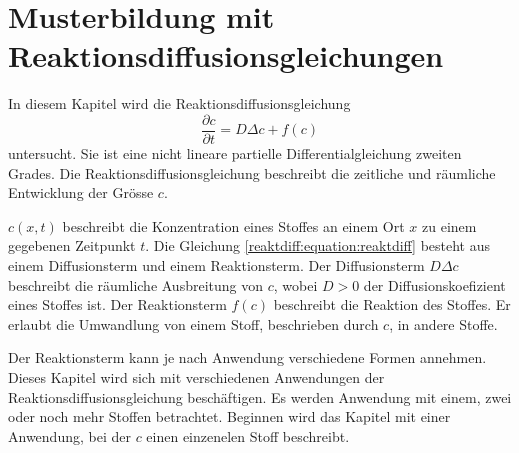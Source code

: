 %
%
%
%
\chapter{Musterbildung mit Reaktionsdiffusionsgleichungen\label{chapter:reaktdiff}}
\begin{refsection}

In diesem Kapitel wird die Reaktionsdiffusionsgleichung
\begin{equation}
\label{reaktdiff:equation:reaktdiff}
\frac{\partial c}{\partial t} = D \Delta c + f(c)
\end{equation}
untersucht.
Sie ist eine nicht lineare partielle Differentialgleichung zweiten Grades.
Die Reaktionsdiffusionsgleichung beschreibt die zeitliche und räumliche Entwicklung der Grösse \(c\).

\(c(x,t)\) beschreibt die Konzentration eines Stoffes an einem Ort \(x\) zu einem gegebenen Zeitpunkt \(t\).
Die Gleichung \eqref{reaktdiff:equation:reaktdiff} besteht aus einem Diffusionsterm und einem Reaktionsterm.
Der Diffusionsterm \(D \Delta c\) beschreibt die räumliche Ausbreitung von \(c\), wobei \(D > 0\) der Diffusionskoefizient eines Stoffes ist.
Der Reaktionsterm \(f(c)\) beschreibt die Reaktion des Stoffes.
Er erlaubt die Umwandlung von einem Stoff, beschrieben durch \(c\), in andere Stoffe.

Der Reaktionsterm kann je nach Anwendung verschiedene Formen annehmen.
Dieses Kapitel wird sich mit verschiedenen Anwendungen der Reaktionsdiffusionsgleichung beschäftigen.
Es werden Anwendung mit einem, zwei oder noch mehr Stoffen betrachtet.
Beginnen wird das Kapitel mit einer Anwendung, bei der \(c\) einen einzenelen Stoff beschreibt.







\printbibliography[heading=subbibliography]
\end{refsection}

